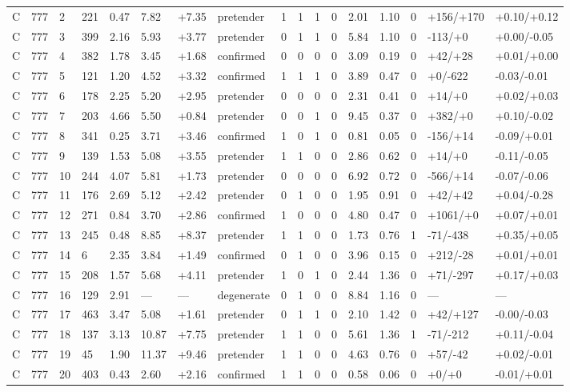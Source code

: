 \documentclass[11pt,a4paper]{article}
\begin{document}
{\begin{longtable}[]{@{}lllllllllllllllll@{}}
C & 777 & 2 & 221 & 0.47 & 7.82 & +7.35 & pretender & 1 & 1 & 1 & 0 & 2.01 & 1.10 & 0 & +156/+170 & +0.10/+0.12 \\
C & 777 & 3 & 399 & 2.16 & 5.93 & +3.77 & pretender & 0 & 1 & 1 & 0 & 5.84 & 1.10 & 0 & -113/+0 & +0.00/-0.05 \\
C & 777 & 4 & 382 & 1.78 & 3.45 & +1.68 & confirmed & 0 & 0 & 0 & 0 & 3.09 & 0.19 & 0 & +42/+28 & +0.01/+0.00 \\
C & 777 & 5 & 121 & 1.20 & 4.52 & +3.32 & confirmed & 1 & 1 & 1 & 0 & 3.89 & 0.47 & 0 & +0/-622 & -0.03/-0.01 \\
C & 777 & 6 & 178 & 2.25 & 5.20 & +2.95 & pretender & 0 & 0 & 0 & 0 & 2.31 & 0.41 & 0 & +14/+0 & +0.02/+0.03 \\
C & 777 & 7 & 203 & 4.66 & 5.50 & +0.84 & pretender & 0 & 0 & 1 & 0 & 9.45 & 0.37 & 0 & +382/+0 & +0.10/-0.02 \\
C & 777 & 8 & 341 & 0.25 & 3.71 & +3.46 & confirmed & 1 & 0 & 1 & 0 & 0.81 & 0.05 & 0 & -156/+14 & -0.09/+0.01 \\
C & 777 & 9 & 139 & 1.53 & 5.08 & +3.55 & pretender & 1 & 1 & 0 & 0 & 2.86 & 0.62 & 0 & +14/+0 & -0.11/-0.05 \\
C & 777 & 10 & 244 & 4.07 & 5.81 & +1.73 & pretender & 0 & 0 & 0 & 0 & 6.92 & 0.72 & 0 & -566/+14 & -0.07/-0.06 \\
C & 777 & 11 & 176 & 2.69 & 5.12 & +2.42 & pretender & 0 & 1 & 0 & 0 & 1.95 & 0.91 & 0 & +42/+42 & +0.04/-0.28 \\
C & 777 & 12 & 271 & 0.84 & 3.70 & +2.86 & confirmed & 1 & 0 & 0 & 0 & 4.80 & 0.47 & 0 & +1061/+0 & +0.07/+0.01 \\
C & 777 & 13 & 245 & 0.48 & 8.85 & +8.37 & pretender & 1 & 1 & 0 & 0 & 1.73 & 0.76 & 1 & -71/-438 & +0.35/+0.05 \\
C & 777 & 14 & 6 & 2.35 & 3.84 & +1.49 & confirmed & 0 & 1 & 0 & 0 & 3.96 & 0.15 & 0 & +212/-28 & +0.01/+0.01 \\
C & 777 & 15 & 208 & 1.57 & 5.68 & +4.11 & pretender & 1 & 0 & 1 & 0 & 2.44 & 1.36 & 0 & +71/-297 & +0.17/+0.03 \\
C & 777 & 16 & 129 & 2.91 & --- & --- & degenerate & 0 & 1 & 0 & 0 & 8.84 & 1.16 & 0 & --- & --- \\
C & 777 & 17 & 463 & 3.47 & 5.08 & +1.61 & pretender & 0 & 1 & 1 & 0 & 2.10 & 1.42 & 0 & +42/+127 & -0.00/-0.03 \\
C & 777 & 18 & 137 & 3.13 & 10.87 & +7.75 & pretender & 1 & 1 & 0 & 0 & 5.61 & 1.36 & 1 & -71/-212 & +0.11/-0.04 \\
C & 777 & 19 & 45 & 1.90 & 11.37 & +9.46 & pretender & 1 & 1 & 0 & 0 & 4.63 & 0.76 & 0 & +57/-42 & +0.02/-0.01 \\
C & 777 & 20 & 403 & 0.43 & 2.60 & +2.16 & confirmed & 1 & 1 & 0 & 0 & 0.58 & 0.06 & 0 & +0/+0 & -0.01/+0.01 \\
\end{longtable}
}
\endgroup
\end{document}
